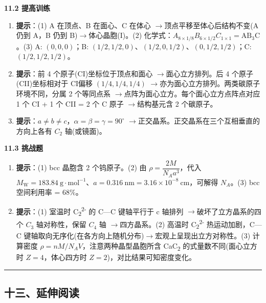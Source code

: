 \documentclass[a4paper,11pt]{ctexart}
\newcommand{\箭}{\ensuremath{\rightarrow}}
\newcommand{\左箭}{\ensuremath{\leftarrow}}
\newcommand{\上箭}{\ensuremath{\uparrow}}
\newcommand{\下箭}{\ensuremath{\downarrow}}
\newcommand{\衡}{\ensuremath{\rightleftharpoons}}
\newcommand{\双箭}{\ensuremath{\leftrightarrow}}
\newcommand{\约等于}{\ensuremath{\approx}}
\newcommand{\小于等于}{\ensuremath{\leq}}
\newcommand{\大于等于}{\ensuremath{\geq}}
\newcommand{\不等于}{\ensuremath{\neq}}
\newcommand{\西格马}{\ensuremath{\sigma}}
\newcommand{\派}{\ensuremath{\pi}}
\begin{document}
\textbf{11.2 提高训练}

\begin{enumerate}
\def\labelenumi{\arabic{enumi}.}
\setcounter{enumi}{3}
\item
  \textbf{提示}：(1) A 在顶点、B 在面心、C 在体心 \箭 顶点平移至体心后结构不变(A 仍到 A，B 仍到 B)\箭 体心晶胞(I)。(2) 化学式：\(A_{8\times 1/8} B_{6\times 1/2} C_{1\times 1} = \mathrm{AB_3C}\)。(3) A: \((0,0,0)\)；B: \((1/2,1/2,0)\)、\((1/2,0,1/2)\)、\((0,1/2,1/2)\)；C: \((1/2,1/2,1/2)\)。
\item
  \textbf{提示}：前 4 个原子(CI)坐标位于顶点和面心 \箭 面心立方排列。后 4 个原子(CII)坐标相对于 CI偏移 \((1/4, 1/4, 1/4)\) \箭 亦为面心立方排列。两类碳原子环境不同，分属 2 个等同点系 \箭 点阵为面心立方。每个面心立方点阵点对应 1 个 CI + 1 个 CII = 2 个 C 原子 \箭 结构基元含 2 个碳原子。
\item
  \textbf{提示}：\(a \neq b \neq c\)，\(\alpha = \beta = \gamma = 90^\circ\) \箭 正交晶系。正交晶系在三个互相垂直的方向上各有 \(C_2\) 轴(或镜面)。
\end{enumerate}

\textbf{11.3 挑战题}

\begin{enumerate}
\def\labelenumi{\arabic{enumi}.}
\setcounter{enumi}{6}
\item
  \textbf{提示}：(1) bcc 晶胞含 2 个钨原子。(2) 由 \(\rho = \dfrac{2M}{N_A a^3}\)，代入 \(M_{\mathrm{W}} = 183.84\ \mathrm{g\cdot mol^{-1}}\)、\(a = 0.316\ \mathrm{nm} = 3.16\times 10^{-8}\ \mathrm{cm}\)，可解得 \(N_A\)。(3) bcc 空间利用率 = 68\%。
\item
  \textbf{提示}：(1) 室温时 C\textsubscript{2}\textsuperscript{2-} 的 C---C 键轴平行于 c 轴排列 \箭 破坏了立方晶系的四个 \(C_3\) 轴对称性，保留 \(C_4\) 轴 \箭 四方晶系。(2) 高温时 C\textsubscript{2}\textsuperscript{2-} 热运动加剧，C---C 键轴取向无序化(在各方向上随机分布)\箭 宏观上呈现出立方对称性。(3) 计算密度 \(\rho = nM/N_A V\)，注意两种晶型晶胞所含 CaC\textsubscript{2} 的式量数不同(面心立方时 \(Z = 4\)，体心四方时 \(Z = 2\))，对比结果可知密度变化。
\end{enumerate}

\begin{center}\rule{0.5\linewidth}{0.5pt}\end{center}

\subsection{十三、延伸阅读}\label{ux5341ux4e09ux5ef6ux4f38ux9605ux8bfb}
\end{document}
